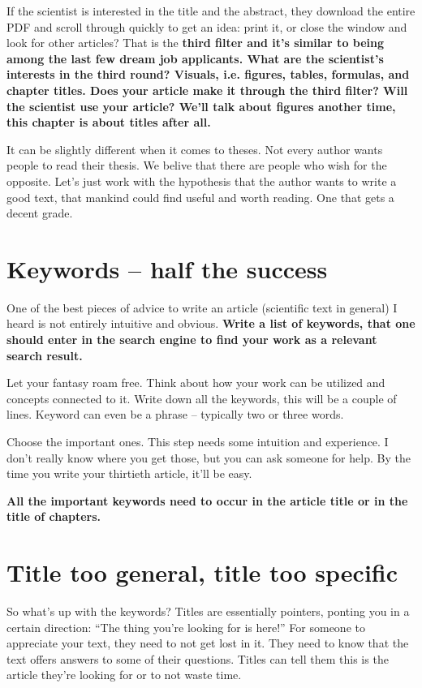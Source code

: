If the scientist is interested in the title and the abstract, they download the entire PDF and scroll through quickly to get an idea: print it, or close the window and look for other articles? That is the \bf third filter \rm and it's similar to being among the last few dream job applicants. What are the scientist's interests in the third round? Visuals, i.e. figures, tables, formulas, and chapter titles. Does your article make it through the third filter? Will the scientist use your article? We'll talk about figures another time, this chapter is about titles after all.

It can be slightly different when it comes to theses. Not every author wants people to read their thesis. We belive that there are people who wish for the opposite. Let's just work with the hypothesis that the author wants to write a good text, that mankind could find useful and worth reading. One that gets a decent grade.


\section{Keywords -- half the success}

One of the best pieces of advice to write an article (scientific text in general) I heard is not entirely intuitive and obvious.
\bf Write a list of keywords, that one should enter in the search engine to find your work as a relevant search result. \rm

Let your fantasy roam free. Think about how your work can be utilized and concepts connected to it. Write down all the keywords, this will be a couple of lines. Keyword can even be a phrase -- typically two or three words.

Choose the important ones. This step needs some intuition and experience. I don't really know where you get those, but you can ask someone for help. By the time you write your thirtieth article, it'll be easy.

\bf All the important keywords need to occur in the article title or in the title of chapters. \rm 

\section{Title too general, title too specific}

So what's up with the keywords? Titles are essentially pointers, ponting you in a certain direction: ``The thing you're looking for is here!'' For someone to appreciate your text, they need to not get lost in it. They need to know that the text offers answers to some of their questions. Titles can tell them this is the article they're looking for or to not waste time.

